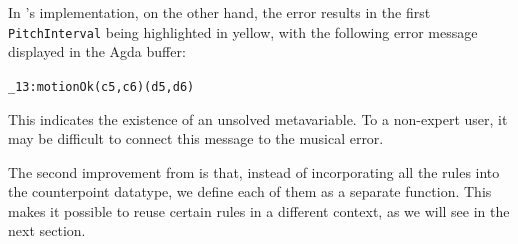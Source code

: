 \noindent In \citet{cong-cp}'s implementation, on the other hand,
the error results in the first \texttt{PitchInterval} being
highlighted in yellow, with the following error message displayed
in the Agda buffer:

\begin{alltt}
\_13 : motionOk (c 5 , c 6) (d 5 , d 6)
\end{alltt}

\noindent This indicates the existence of an unsolved metavariable.
To a non-expert user, it may be difficult to connect this message to
the musical error.

The second improvement from \citet{cong-cp} is that, instead of
incorporating all the rules into the counterpoint datatype, we define
each of them as a separate function.
This makes it possible to reuse certain rules in a different context,
as we will see in the next section.

